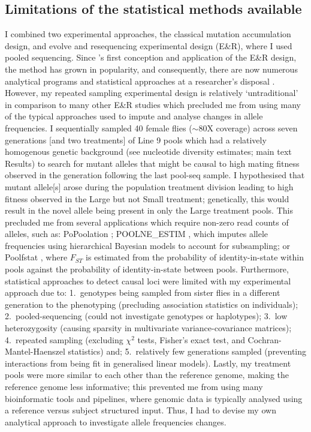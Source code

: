 \subsection{Limitations of the statistical methods available}

I combined two experimental approaches, the classical mutation accumulation design, and evolve and resequencing experimental design (E\&R), where I used pooled sequencing. Since \citet{Turn11}'s first conception and application of the E\&R design, the method has grown in popularity, and consequently, there are now numerous analytical programs and statistical approaches at a researcher’s disposal \citep{Schl14, Schl15, Vlac19}. However, my repeated sampling experimental design is relatively ‘untraditional’ in comparison to many other E\&R studies which precluded me from using many of the typical approaches used to impute and analyse changes in allele frequencies. I sequentially sampled 40 female flies ($\sim80$X coverage) across seven generations [and two treatments] of Line 9 pools which had a relatively homogenous genetic background (see nucleotide diversity estimates; main text Results) to search for mutant alleles that might be causal to high mating fitness observed in the generation following the last pool-seq sample. I hypothesised that mutant allele[s] arose during the population treatment division leading to high fitness observed in the Large but not Small treatment; genetically, this would result in the novel allele being present in only the Large treatment pools. This precluded me from several applications which require non-zero read counts of alleles, such as: PoPoolation \citep{Kofl11}; POOLNE\_ESTIM \citep{Gaut13}, which imputes allele frequencies using hierarchical Bayesian models to account for subsampling; or Poolfstat \citep{Hive18}, where $F_{ST}$ is estimated from the probability of identity-in-state within pools against the probability of identity-in-state between pools. Furthermore, statistical approaches to detect causal loci were limited with my experimental approach due to: 1.~genotypes being sampled from sister flies in a different generation to the phenotyping (precluding association statistics on individuals); 2.~pooled-sequencing (could not investigate genotypes or haplotypes); 3.~low heterozygosity (causing sparsity in multivariate variance-covariance matrices); 4.~repeated sampling (excluding $\chi^2$ tests, Fisher’s exact test, and Cochran-Mantel-Haenszel statistics) and; 5.~relatively few generations sampled (preventing interactions from being fit in generalised linear models). Lastly, my treatment pools were more similar to each other than the reference genome, making the reference genome less informative; this prevented me from using many bioinformatic tools and pipelines, where genomic data is typically analysed using a reference versus subject structured input. Thus, I had to devise my own analytical approach to investigate allele frequencies changes. \par

